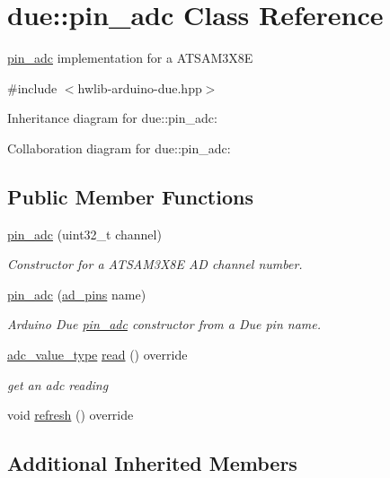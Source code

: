 \hypertarget{classdue_1_1pin__adc}{}\section{due\+:\+:pin\+\_\+adc Class Reference}
\label{classdue_1_1pin__adc}


\hyperlink{classdue_1_1pin__adc}{pin\+\_\+adc} implementation for a A\+T\+S\+A\+M3\+X8E  




{\ttfamily \#include $<$hwlib-\/arduino-\/due.\+hpp$>$}



Inheritance diagram for due\+:\+:pin\+\_\+adc\+:


Collaboration diagram for due\+:\+:pin\+\_\+adc\+:
\subsection*{Public Member Functions}
\begin{DoxyCompactItemize}
\item 
\hyperlink{classdue_1_1pin__adc_a830aea1f1d8f1b538e73ac57ece494c1}{pin\+\_\+adc} (uint32\+\_\+t channel)
\begin{DoxyCompactList}\small\item\em Constructor for a A\+T\+S\+A\+M3\+X8E AD channel number. \end{DoxyCompactList}\item 
\hyperlink{classdue_1_1pin__adc_a106bc97a20bb90be8cc0d8d9152d201f}{pin\+\_\+adc} (\hyperlink{namespacedue_a5ecc98d40585c91eabbfb14f71bd7d4c}{ad\+\_\+pins} name)
\begin{DoxyCompactList}\small\item\em Arduino Due \hyperlink{classdue_1_1pin__adc}{pin\+\_\+adc} constructor from a Due pin name. \end{DoxyCompactList}\item 
\hyperlink{classhwlib_1_1adc_a1faacac0cc2f78e90652b17250cbe159}{adc\+\_\+value\+\_\+type} \hyperlink{classdue_1_1pin__adc_a3b562b594bbbe3e8815a9223fa6520cc}{read} () override
\begin{DoxyCompactList}\small\item\em get an adc reading \end{DoxyCompactList}\item 
void \hyperlink{classdue_1_1pin__adc_ab30deacf575e1ef59af13aea24f77584}{refresh} () override
\end{DoxyCompactItemize}
\subsection*{Additional Inherited Members}


